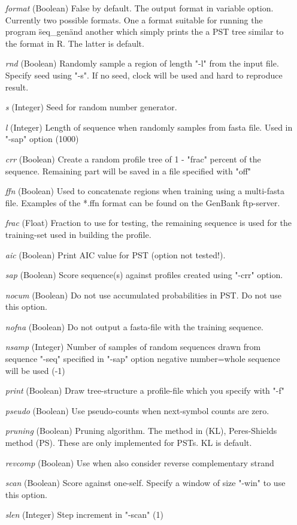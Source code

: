 \documentclass[]{article}
\begin{document}
\begin{itemize}
\item[\textit{format}] (Boolean) False by default. 
                  The output format in variable option. Currently two possible formats.
                  One a format suitable for running the program \"seq\_gen\" and another which simply
                  prints the a PST tree similar to the format in R. The latter is default.
\item[\textit{rnd}]  (Boolean) Randomly sample a region of length "-l"
  from the input file. Specify seed using "-s". If no seed, clock will be
  used and hard to reproduce result.
\item[\textit{s}] (Integer) Seed for random number generator.
\item[\textit{l}]  (Integer) Length of sequence when randomly samples from fasta
  file. Used in "-sap" option (1000)
\item[\textit{crr}] (Boolean) Create a random profile tree of 1 - "frac" percent
         of the sequence. Remaining part will be saved in a file
         specified with "off" 
\item[\textit{ffn}] (Boolean) Used to concatenate regions when training
  using a  multi-fasta file. Examples of the *.ffn format can be found on
  the GenBank ftp-server.
\item[\textit{frac}] (Float) Fraction to use for testing, the remaining sequence is
  used for the training-set used in building the profile.
\item[\textit{aic}] (Boolean) Print AIC value for PST (option not tested!).
\item[\textit{sap}] (Boolean) Score sequence(s) against profiles created using "-crr"
 option.
\item[\textit{nocum}] (Boolean) Do not use accumulated probabilities in
  PST. Do not use this option.
\item[\textit{nofna}] (Boolean) Do not output a fasta-file with the
  training sequence.
\item[\textit{nsamp}] (Integer) Number of samples of random sequences drawn from
         sequence "-seq" specified in "-sap" option
         negative number=whole sequence will be used (-1)
\item[\textit{print}] (Boolean) Draw tree-structure a profile-file which
  you specify with "-f"
\item[\textit{pseudo}] (Boolean) Use pseudo-counts when next-symbol counts
  are zero.
\item[\textit{pruning}] (Boolean) Pruning algorithm. The method in \cite{BuhWyn1999} (KL), Peres-Shields method (PS). These are only implemented for
  PSTs. KL is default.  
\item[\textit{revcomp}] (Boolean) Use when also consider reverse complementary strand
\item[\textit{scan}] (Boolean) Score against one-self. Specify a window of size
  "-win" to use this option.
\item[\textit{slen}] (Integer) Step increment in "-scan" (1)
\end{itemize}
\end{document}
